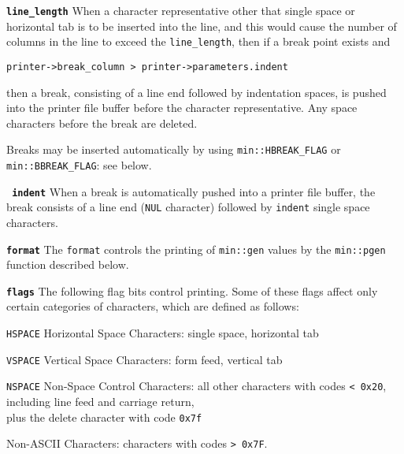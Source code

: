 \documentclass[12pt]{article}
\makeatletter
\newcommand{\ttmkey}[2]{{\tt \bf #1}\index{#1@{\tt #1}!#2}}
\newcommand{\ttnbmkey}[2]{{\tt #1}\index{#1@{\tt #1}!#2}}
\newcommand{\EOL}{\penalty \exhyphenpenalty}
\newenvironment{itemlist}[1][1.2in]%
	{\begin{list}{}{\setlength{\labelwidth}{#1}%
		        \setlength{\leftmargin}{\labelwidth}%
		        \addtolength{\leftmargin}{+0.2in}%
		        \renewcommand{\makelabel}[1]{##1\hfill}}}%
	{\end{list}}
\makeatother
\begin{document}
\begin{itemlist}

\item[\ttmkey{line\_length}{in {\tt min::printer\_parameters}}]
When a character representative other that single space or horizontal
tab is to be inserted into the line, and this would cause the number
of columns in the line to exceed the {\tt line\_length}, then if a
break point exists and
\begin{center}
\verb|printer->break_column > printer->parameters.indent|
\end{center}
then a break, consisting of a line end followed by indentation spaces,
is pushed into the printer file buffer before the character representative.
Any space characters before the break are deleted.

Breaks may be inserted automatically by using
{\tt min::\EOL HBREAK\_\EOL FLAG} or
{\tt min::\EOL BBREAK\_\EOL FLAG}: see below.

\item[\ttmkey{ indent}{in {\tt min::printer\_parameters}}]
When a break is automatically pushed into a printer file buffer, the
break consists of a line end ({\tt NUL} character) followed by
{\tt indent} single space characters.

\item[\ttmkey{format}{in {\tt min::printer\_parameters}}]
The {\tt format}
controls the printing of
{\tt min::gen} values by the {\tt min::pgen} function described
below.

\item[\ttmkey{flags}{in {\tt min::printer\_parameters}}]\label{PRINTER_FLAGS}
The following flag bits control printing.  Some of these
flags affect only certain categories of characters, which are
defined as follows:

\begin{itemlist}[0.8in]
\item[\ttnbmkey{HSPACE}{character category}]
    Horizontal Space Characters: single space, horizontal tab
\item[\ttnbmkey{VSPACE}{character category}]
    Vertical Space Characters: form feed, vertical tab
\item[\ttnbmkey{NSPACE}{character category}]
    Non-Space Control Characters: all other characters
with codes {\tt < 0x20}, including line feed and carriage return, \\
plus the delete character with code {\tt 0x7f}
\item[] Non-ASCII Characters: characters
with codes {\tt > 0x7F}.
\end{itemlist}

\end{itemlist}
\end{document}
